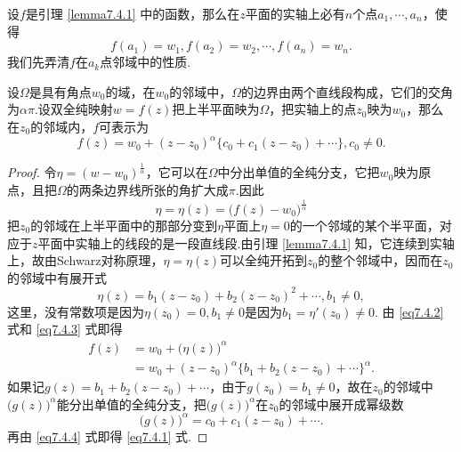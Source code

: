 设$f$是引理 \ref{lemma7.4.1} 中的函数，那么在$z$平面的实轴上必有$n$个点$a_1,\cdots,a_n$，使得
\[f(a_1)=w_1,f(a_2)=w_2,\cdots,f(a_n)=w_n.\]
我们先弄清$f$在$a_k$点邻域中的性质.

\begin{lemma}\label{lemma7.4.2}
设$\Omega$是具有角点$w_0$的域，在$w_0$的邻域中，$\Omega$的边界由两个直线段构成，它们的交角为$\alpha\pi$.设双全纯映射$w=f(z)$把上半平面映为$\Omega$，把实轴上的点$z_0$映为$w_0$，那么在$z_0$的邻域内，$f$可表示为
\begin{equation}\label{eq7.4.1}
f(z)=w_0+(z-z_0)^\alpha\{c_0+c_1(z-z_0)+\cdots\},c_0\ne0.
\end{equation}
\end{lemma}
\begin{proof}
令$\eta=(w-w_0)^{\frac1\alpha}$，它可以在$\Omega$中分出单值的全纯分支，它把$w_0$映为原点，且把$\Omega$的两条边界线所张的角扩大成$\pi$.因此
\begin{equation}\label{eq7.4.2}
\eta=\eta(z)=\big(f(z)-w_0\big)^{\frac1\alpha}
\end{equation}
把$z_0$的邻域在上半平面中的那部分变到$\eta$平面上$\eta=0$的一个邻域的某个半平面，对应于$z$平面中实轴上的线段的是一段直线段.由引理 \ref{lemma7.4.1} 知，它连续到实轴上，故由Schwarz对称原理，$\eta=\eta(z)$可以全纯开拓到$z_0$的整个邻域中，因而在$z_0$的邻域中有展开式
\begin{equation}\label{eq7.4.3}
\eta(z)=b_1(z-z_0)+b_2(z-z_0)^2+\cdots,b_1\ne0,
\end{equation}
这里，没有常数项是因为$\eta(z_0)=0,b_1\ne0$是因为$b_1=\eta'(z_0)\ne0$. 由 \eqref{eq7.4.2} 式和 \eqref{eq7.4.3} 式即得
\begin{equation}\label{eq7.4.4}
\begin{aligned}
f(z)&=w_0+\big(\eta(z)\big)^\alpha\\
&=w_0+(z-z_0)^\alpha\{b_1+b_2(z-z_0)+\cdots\}^\alpha.
\end{aligned}
\end{equation}
如果记$g(z)=b_1+b_2(z-z_0)+\cdots$，由于$g(z_0)=b_1\ne0$，故在$z_0$的邻域中$\big(g(z)\big)^\alpha$能分出单值的全纯分支，把$\big(g(z)\big)^\alpha$在$z_0$的邻域中展开成幂级数
\[\big(g(z)\big)^\alpha=c_0+c_1(z-z_0)+\cdots.\]
再由 \eqref{eq7.4.4} 式即得 \eqref{eq7.4.1} 式.
\end{proof}

